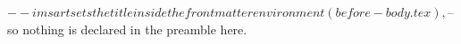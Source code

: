 $-- imsart sets the title inside the frontmatter environment (before-body.tex),
$-- so nothing is declared in the preamble here.
